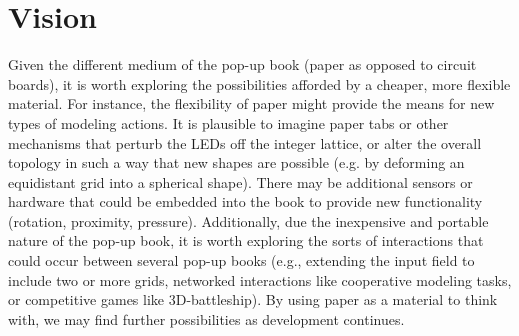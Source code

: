 \chapter{Vision}
\label{vision}


Given the different medium of the pop-up book (paper as opposed to circuit
boards), it is worth exploring the possibilities afforded by a cheaper, more
flexible material. For instance, the flexibility of paper might provide the
means for new types of modeling actions. It is plausible to imagine paper tabs
or other mechanisms that perturb the LEDs off the integer lattice, or alter the
overall topology in such a way that new shapes are possible (e.g. by deforming
an equidistant grid into a spherical shape). There may be additional sensors or
hardware that could be embedded into the book to provide new functionality
(rotation, proximity, pressure). Additionally, due the inexpensive and portable
nature of the pop-up book, it is worth exploring the sorts of interactions that
could occur between several pop-up books (e.g., extending the input field to
include two or more grids, networked interactions like cooperative modeling
tasks, or competitive games like 3D-battleship). By using paper as a material to
think with, we may find further possibilities as development continues.
